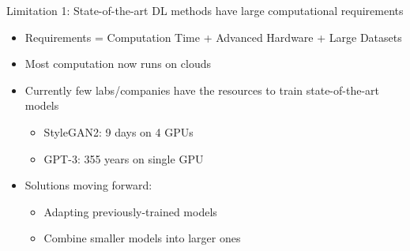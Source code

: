 \documentclass[8pt,xcolor=table,aspectratio=169]{beamer}
\begin{document}
\begin{frame}{Limitation 1: State-of-the-art DL methods have large computational requirements}

\begin{itemize}
\item Requirements = Computation Time + Advanced Hardware + Large Datasets

\vo 

\item Most computation now runs on clouds\\ 


\vo

 \item Currently few labs/companies have the resources to train state-of-the-art models
 \begin{itemize}
  \item StyleGAN2: 9 days on 4 GPUs
  \item GPT-3: 355 years on single GPU
 \end{itemize}

 
\vo


\vo
 \item Solutions moving forward:
 \begin{itemize}
\item Adapting previously-trained models
\item Combine smaller models into larger ones
\end{itemize}
\end{itemize}

 
\end{frame}
\end{document}
